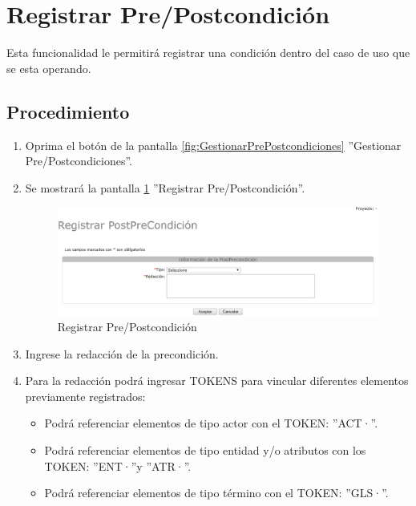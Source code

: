
\hypertarget{cv:registrarCondicion}{\section{Registrar Pre/Postcondición}} \label{sec:registrarCondicion}

	Esta funcionalidad le permitirá registrar una condición dentro del caso de uso que se esta operando.

		\subsection{Procedimiento}

			\begin{enumerate}
	
			\item Oprima el botón \IURegistrar{} de la pantalla \ref{fig:GestionarPrePostcondiciones} ''Gestionar Pre/Postcondiciones''.
			
			\item Se mostrará la pantalla \ref{fig:registrarPrePostcondicion} ''Registrar Pre/Postcondición''.

			\begin{figure}[htbp!]
				\begin{center}
					\includegraphics[scale=0.6]{roles/lider/casosUso/precondiciones/pantallas/IU6-1-2-1registrarCondicion}
					\caption{Registrar Pre/Postcondición}
					\label{fig:registrarPrePostcondicion}
				\end{center}
			\end{figure}
		
			\item Ingrese la redacción de la precondición.
			
			\item Para la redacción podrá ingresar TOKENS para vincular diferentes elementos previamente registrados:
			
			\begin{itemize}
				\item Podrá referenciar elementos de tipo actor con el TOKEN: ''ACT·''.
				\item Podrá referenciar elementos de tipo entidad y/o atributos con los TOKEN: ''ENT·''y ''ATR·''.
				\item Podrá referenciar elementos de tipo término con el TOKEN: ''GLS·''.
			\end{itemize}
			

\end{enumerate}
